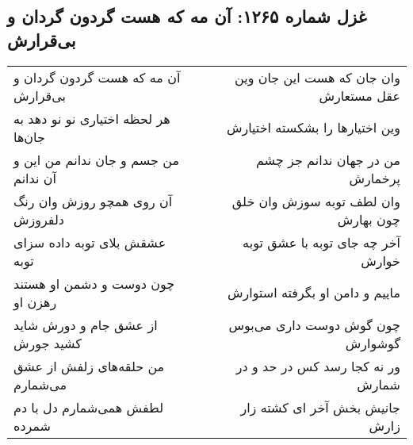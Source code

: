 \begin{center}
\section*{غزل شماره ۱۲۶۵: آن مه که هست گردون گردان و بی‌قرارش}
\label{sec:1265}
\begin{longtable}{l p{0.5cm} r}
آن مه که هست گردون گردان و بی‌قرارش
&&
وان جان که هست این جان وین عقل مستعارش
\\
هر لحظه اختیاری نو نو دهد به جان‌ها
&&
وین اختیارها را بشکسته اختیارش
\\
من جسم و جان ندانم من این و آن ندانم
&&
من در جهان ندانم جز چشم پرخمارش
\\
آن روی همچو روزش وان رنگ دلفروزش
&&
وان لطف توبه سوزش وان خلق چون بهارش
\\
عشقش بلای توبه داده سزای توبه
&&
آخر چه جای توبه با عشق توبه خوارش
\\
چون دوست و دشمن او هستند رهزن او
&&
ماییم و دامن او بگرفته استوارش
\\
از عشق جام و دورش شاید کشید جورش
&&
چون گوش دوست داری می‌بوس گوشوارش
\\
من حلقه‌های زلفش از عشق می‌شمارم
&&
ور نه کجا رسد کس در حد و در شمارش
\\
لطفش همی‌شمارم دل با دم شمرده
&&
جانیش بخش آخر ای کشته زار زارش
\\
\end{longtable}
\end{center}
